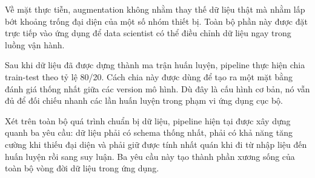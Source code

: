 Về mặt thực tiễn, augmentation không nhằm thay thế dữ liệu thật mà nhằm lấp bớt khoảng trống đại diện của một số nhóm thiết bị. Toàn bộ phần này được đặt trực tiếp vào ứng dụng để data scientist có thể điều chỉnh dữ liệu ngay trong luồng vận hành.


Sau khi dữ liệu đã được dựng thành ma trận huấn luyện, pipeline thực hiện chia train-test theo tỷ lệ 80/20. Cách chia này được dùng để tạo ra một mặt bằng đánh giá thống nhất giữa các version mô hình. Dù đây là cấu hình cơ bản, nó vẫn đủ để đối chiếu nhanh các lần huấn luyện trong phạm vi ứng dụng cục bộ.

Xét trên toàn bộ quá trình chuẩn bị dữ liệu, pipeline hiện tại được xây dựng quanh ba yêu cầu: dữ liệu phải có schema thống nhất, phải có khả năng tăng cường khi thiếu đại diện và phải giữ được tính nhất quán khi đi từ nhập liệu đến huấn luyện rồi sang suy luận. Ba yêu cầu này tạo thành phần xương sống của toàn bộ vòng đời dữ liệu trong ứng dụng.

